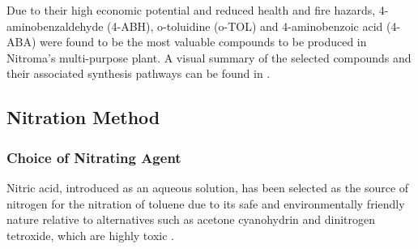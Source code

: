 Due to their high economic potential and reduced health and fire hazards, 4-aminobenzaldehyde (4-ABH), o-toluidine (o-TOL) and 4-aminobenzoic acid (4-ABA) were found to be the most valuable compounds to be produced in Nitroma's multi-purpose plant.  A visual summary of the selected compounds and their associated synthesis pathways can be found in .


\subsection{Nitration Method}
\subsubsection{Choice of Nitrating Agent}
Nitric acid, introduced as an aqueous solution, has been selected as the source of nitrogen for the nitration of toluene due to its safe and environmentally friendly nature relative to alternatives such as acetone cyanohydrin and dinitrogen tetroxide, which are highly toxic \cite{miller_kinetics_1964,dagade_nitration_2002, sreedhar_scientific_2013}. 



\begin{comment}
Nitric acid has been selected as the source of nitrogen for the nitration of toluene for its safe and environmentally friendly nature relative to other possible nitrating agents, high availability, and its various favourable properties \cite{miller_kinetics_1964, sreedhar_scientific_2013}. Although nitric acid is a highly acidic and volatile compound, compared to alternatives such as acetone cyanohydrin and dinitrogen tetroxide which are highly toxic, nitric acid is more appropriate for industrial-scale nitration of toluene \cite{dagade_nitration_2002, sreedhar_scientific_2013}. Nitric acid, introduced as an aqueous solution, is the most commonly used and well-studied nitrating agent for this process in industry. \cite{bowers_toluidines_2000} A big advantage of aqueous nitric acid is that it can act as a self-catalyst by self-donating protons. \cite{miller_kinetics_1964} A common alternative to nitric acid is acetyl nitrate which is formed by the reaction of nitric acid with acetic anhydride. \cite{vassena_selective_1999} This reaction yields formic acid as by-product, resulting in a lower atom economy; it also causes unnecessary difficulties in separations downstream by introducing three extra components: acetyl nitrate, acetic anhydride, and formic acid. The same argument can be employed for other alkyl nitrates such as butyl nitrate. To this end, nitric acid is deemed as the most suitable choice among all candidates.
\end{comment}

